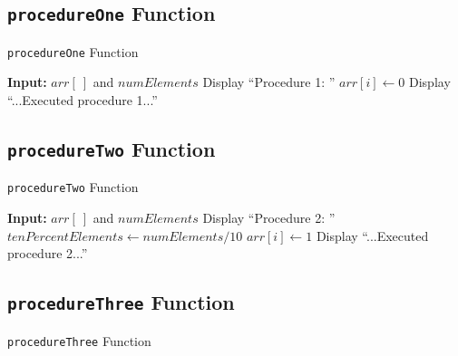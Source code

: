 \documentclass[10pt, conference]{IEEEtran}
\begin{document}
\begin{appendices}
\begin{algorithm}[h!]
\begin{algorithmic}
\end{algorithmic}
\end{algorithm}


\subsection{\texttt{procedureOne} Function}

\begin{algorithm}[h!]
\caption{\texttt{procedureOne} Function}
\label{procedureOne}
\begin{algorithmic} 

\STATE \textbf{Input:} $arr[\ ]$ and $numElements$
\STATE
\STATE Display ``Procedure 1: ''
	\STATE $arr[i] \leftarrow 0$
\ENDFOR
\STATE Display ``...Executed procedure 1...''

\end{algorithmic}
\end{algorithm}

\subsection{\texttt{procedureTwo} Function}

\begin{algorithm}[h!]
\caption{\texttt{procedureTwo} Function}
\label{procedureTwo}
\begin{algorithmic} 

\STATE \textbf{Input:} $arr[\ ]$ and $numElements$
\STATE
\STATE Display ``Procedure 2: ''
\STATE $tenPercentElements \leftarrow numElements/10$
		\STATE $arr[i] \leftarrow 1$
	\ENDIF
\ENDFOR
\STATE Display ``...Executed procedure 2...''

\end{algorithmic}
\end{algorithm}

\subsection{\texttt{procedureThree} Function}

\begin{algorithm}[h!]
\caption{\texttt{procedureThree} Function}
\label{procedureThree}
\begin{algorithmic} 


\end{algorithmic}
\end{algorithm}
\end{appendices}
\end{document}
